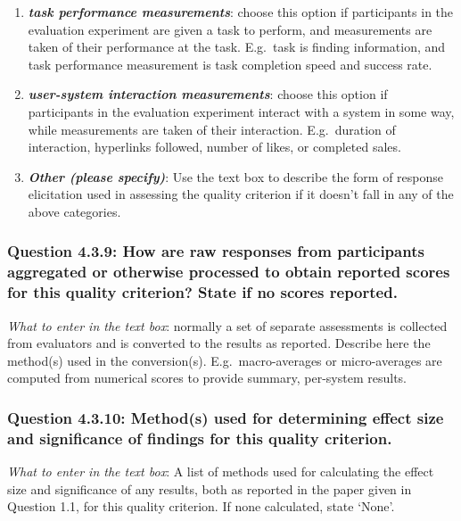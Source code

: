 \documentclass[11pt,a4paper]{article}
\newcommand{\egcvalue}[1]{\textbf{\textit{#1}}}
\begin{document}
\begin{enumerate}[itemsep=0cm,leftmargin=0.5cm,label={\LARGE $\circ$}]
    \item \egcvalue{task performance measurements}: choose this option if participants in the evaluation experiment are given a task to perform, and measurements are taken of their performance at the task.  E.g.\ task is finding information, and task performance measurement is task completion speed and success rate.
    \item \egcvalue{user-system interaction measurements}: choose this option if participants in the evaluation experiment interact with a system in some way, while measurements are taken of their interaction. E.g.\ duration of interaction, hyperlinks followed, number of likes, or completed sales.
    \item \egcvalue{Other (please specify)}: Use the text box to describe the form of response elicitation used in assessing the quality criterion if it doesn't fall in any of the above categories.
\end{enumerate}

\subsubsection*{Question 4.3.9:  How are raw responses from participants aggregated or otherwise processed to obtain reported scores for this quality criterion? State if no scores reported.}
\vspace{-.1cm}

\vspace{.3cm}
\noindent\textit{What to enter in the text box}:  normally a set of separate assessments is collected from evaluators and is converted to the results as reported. Describe here the method(s) used in the conversion(s). E.g.\ macro-averages or micro-averages are computed from numerical scores to provide summary, per-system results.

\vspace{-.3cm}
\subsubsection*{Question 4.3.10:  Method(s) used for determining effect size and significance of findings for this quality criterion.}
\vspace{-.1cm}

\vspace{.3cm}
\noindent\textit{What to enter in the text box}: A list of  methods used for calculating the effect size and significance of any results, both as reported in the paper given in Question 1.1, for this quality criterion. If none calculated, state `None'.
\end{document}
